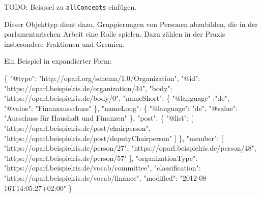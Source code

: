 \documentclass[,a4paper]{article}
\newenvironment{Shaded}{}{}
\newcommand{\DataTypeTok}[1]{\textcolor[rgb]{0.56,0.13,0.00}{{#1}}}
\newcommand{\StringTok}[1]{\textcolor[rgb]{0.25,0.44,0.63}{{#1}}}
\newcommand{\OtherTok}[1]{\textcolor[rgb]{0.00,0.44,0.13}{{#1}}}
\newcommand{\FunctionTok}[1]{\textcolor[rgb]{0.02,0.16,0.49}{{#1}}}
\begin{document}
TODO: Beispiel zu \texttt{allConcepts} einfügen.


Dieser Objekttyp dient dazu, Gruppierungen von Personen abzubilden, die
in der parlamentarischen Arbeit eine Rolle spielen. Dazu zählen in der
Praxis insbesondere Fraktionen und Gremien.

Ein Beispiel in expandierter Form:

\begin{Shaded}
\begin{Highlighting}[]
\FunctionTok{\{}
    \DataTypeTok{"@type"}\FunctionTok{:} \StringTok{"http://oparl.org/schema/1.0/Organization"}\FunctionTok{,}
    \DataTypeTok{"@id"}\FunctionTok{:} \StringTok{"https://oparl.beispielris.de/organization/34"}\FunctionTok{,}
    \DataTypeTok{"body"}\FunctionTok{:} \StringTok{"https://oparl.beispielris.de/body/0"}\FunctionTok{,}
    \DataTypeTok{"nameShort"}\FunctionTok{:} \FunctionTok{\{}
        \DataTypeTok{"@language"} \FunctionTok{:}\StringTok{"de"}\FunctionTok{,}
        \DataTypeTok{"@value"}\FunctionTok{:} \StringTok{"Finanzausschuss"}
    \FunctionTok{\},}
    \DataTypeTok{"nameLong"}\FunctionTok{:} \FunctionTok{\{}
        \DataTypeTok{"@language"}\FunctionTok{:} \StringTok{"de"}\FunctionTok{,}
        \DataTypeTok{"@value"}\FunctionTok{:} \StringTok{"Ausschuss für Haushalt und Finanzen"}
    \FunctionTok{\},}
    \DataTypeTok{"post"}\FunctionTok{:} \FunctionTok{\{}
        \DataTypeTok{"@list"}\FunctionTok{:} \OtherTok{[}
            \StringTok{"https://oparl.beispielris.de/post/chairperson"}\OtherTok{,}
            \StringTok{"https://oparl.beispielris.de/post/deputyChairperson"}
        \OtherTok{]}
    \FunctionTok{\},}
    \DataTypeTok{"member"}\FunctionTok{:} \OtherTok{[}
        \StringTok{"https://oparl.beispielris.de/person/27"}\OtherTok{,}
        \StringTok{"https://oparl.beispielris.de/person/48"}\OtherTok{,}
        \StringTok{"https://oparl.beispielris.de/person/57"}
    \OtherTok{]}\FunctionTok{,}
    \DataTypeTok{"organizationType"}\FunctionTok{:} \StringTok{"https://oparl.beispielris.de/vocab/committee"}\FunctionTok{,}
    \DataTypeTok{"classification"}\FunctionTok{:} \StringTok{"https://oparl.beispielris.de/vocab/finance"}\FunctionTok{,}
    \DataTypeTok{"modified"}\FunctionTok{:} \StringTok{"2012-08-16T14:05:27+02:00"}
\FunctionTok{\}}
\end{Highlighting}
\end{Shaded}
\end{document}
